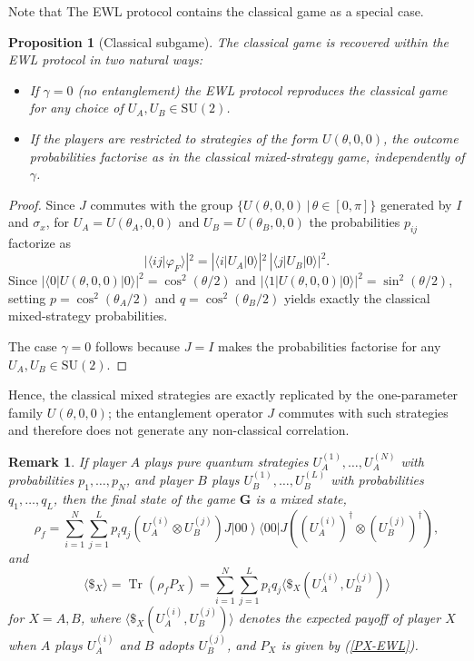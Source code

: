 \documentclass[11pt,a4paper,twoside]{article}
\DeclareMathOperator{\Tr}{Tr}
\newcommand{\SU}{\mathrm{SU}}
\newcommand{\ket}[1]{\left| #1 \right\rangle} %
\newcommand{\bra}[1]{\langle #1 |} %
\newcommand{\braket}[1]{\langle #1 \rangle} %
\newtheorem{proposition}[definition]{Proposition}
\newtheorem{rem}[definition]{Remark}
\newenvironment{remark}{\begin{rem}  \rm }{\end{rem}}
\begin{document}
Note that The EWL protocol contains the classical game as a special case.  
\begin{proposition}[Classical subgame]\label{prop:classical}
The classical game is recovered within the EWL protocol in two natural ways:
\begin{itemize}
\item If $\gamma=0$ (no entanglement) the EWL protocol reproduces the classical game for any choice of $U_A,U_B\in\SU(2)$.
\item If the players are restricted to strategies of the form $U(\theta,0,0)$, the outcome probabilities factorise as in the classical mixed-strategy game, independently of $\gamma$.
      
\end{itemize}
\end{proposition}

\begin{proof}
Since $J$ commutes with the group $\{U(\theta,0,0)\,|\,\theta\in[0,\pi]\}$ generated by $I$ and $\sigma_x$, for $U_A=U(\theta_A,0,0)$ and $U_B=U(\theta_B,0,0)$ the probabilities $p_{ij}$ factorize as
\[|\braket{ij|\varphi_F}|^2=|\braket{i|U_A|0}|^2\,|\braket{j|U_B|0}|^2.\]  
Since $|\braket{0|U(\theta,0,0)|0}|^2=\cos^2(\theta/2)$ and $|\braket{1|U(\theta,0,0)|0}|^2=\sin^2(\theta/2)$, setting $p=\cos^2(\theta_A/2)$ and $q=\cos^2(\theta_B/2)$ yields exactly the classical mixed-strategy probabilities.  

The case $\gamma=0$ follows because $J=I$ makes the probabilities factorise for any $U_A,U_B\in \SU(2)$.
\end{proof}
Hence, the classical mixed strategies are exactly replicated by the one-parameter family \(U(\theta,0,0)\); the entanglement operator \(J\) commutes with such strategies and therefore does not generate any non-classical correlation.

\begin{remark}\rm
If player $A$ plays pure quantum strategies $U_A^{(1)},\ldots,U_A^{(N)}$ with probabilities $p_1,\ldots,p_N$, and player $B$ plays $U_B^{(1)},\ldots,U_B^{(L)}$ with probabilities $q_1,\ldots,q_L$, then the final state of the game $\mathbf{G}$ is a mixed state,
\[
\rho_f=\sum_{i=1}^N\sum_{j=1}^L p_i q_j (U_A^{(i)}\otimes U_B^{(j)})J\ket{00}\bra{00}J((U_A^{(i)})^\dagger\otimes (U_B^{(j)})^\dagger),
\]
and
\begin{equation}\label{eq:payoff-misto}
\langle\$_X\rangle=\Tr(\rho_f P_X)=\sum_{i=1}^N\sum_{j=1}^L p_i q_j \langle\$_X(U_A^{(i)},U_B^{(j)})\rangle
\end{equation}
for $X=A,B$, where $\langle\$_X(U_A^{(i)},U_B^{(j)})\rangle$ denotes the expected payoff of player $X$ when $A$ plays $U_A^{(i)}$ and $B$ adopts $U_B^{(j)}$, and $P_X$ is given by (\ref{PX-EWL}).\end{remark}
\end{document}
